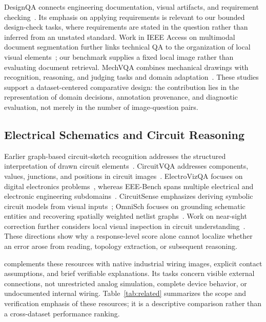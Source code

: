DesignQA connects engineering documentation, visual artifacts, and requirement checking~\cite{doris2025designqa}. Its emphasis on applying requirements is relevant to our bounded design-check tasks, where requirements are stated in the question rather than inferred from an unstated standard. Work in IEEE Access on multimodal document segmentation further links technical QA to the organization of local visual elements~\cite{lvov2026segmentation}; our benchmark supplies a fixed local image rather than evaluating document retrieval. MechVQA combines mechanical drawings with recognition, reasoning, and judging tasks and domain adaptation~\cite{kou2026mechvqa}. These studies support a dataset-centered comparative design: the contribution lies in the representation of domain decisions, annotation provenance, and diagnostic evaluation, not merely in the number of image-question pairs.

\subsection{Electrical Schematics and Circuit Reasoning}
Earlier graph-based circuit-sketch recognition addresses the structured interpretation of drawn circuit elements~\cite{liu2020circuitsketch}. CircuitVQA addresses components, values, junctions, and positions in circuit images~\cite{mehta2024circuitvqa}. ElectroVizQA focuses on digital electronics problems~\cite{meshram2024electrovizqa}, whereas EEE-Bench spans multiple electrical and electronic engineering subdomains~\cite{li2025eeebench}. CircuitSense emphasizes deriving symbolic circuit models from visual inputs~\cite{akbari2025circuitsense}; OmniSch focuses on grounding schematic entities and recovering spatially weighted netlist graphs~\cite{lu2026omnisch}. Work on near-sight correction further considers local visual inspection in circuit understanding~\cite{kulkarni2025nsc}. These directions show why a response-level score alone cannot localize whether an error arose from reading, topology extraction, or subsequent reasoning.

\dataset complements these resources with native industrial wiring images, explicit contact assumptions, and brief verifiable explanations. Its tasks concern visible external connections, not unrestricted analog simulation, complete device behavior, or undocumented internal wiring. Table~\ref{tab:related} summarizes the scope and verification emphasis of these resources; it is a descriptive comparison rather than a cross-dataset performance ranking.

